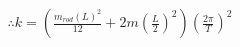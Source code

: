 \documentclass[preview]{standalone}
\begin{document}
\begin{align*}
\therefore k = (\frac{m_{rod}(L)^2}{12} + 2m(\frac{L}{2})^2)(\frac{2\pi}{T})^2
\end{align*}
\end{document}
